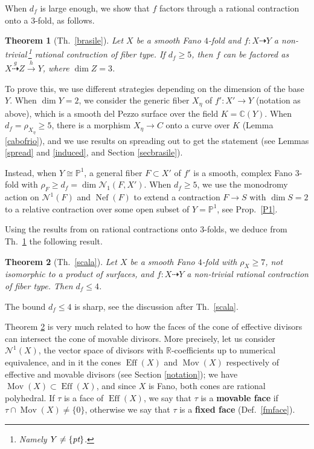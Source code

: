 \documentclass[a4paper,12pt]{amsart}
\newtheorem{thm}{Theorem}[section]
\theoremstyle{definition}
\numberwithin{figure}{section}
\numberwithin{table}{section}
\newcommand{\pr}{\mathbb{P}}
\newcommand{\C}{\mathbb{C}}
\newcommand{\R}{\mathbb{R}}
\newcommand{\N}{\mathcal{N}_1}
\newcommand{\Nu}{\mathcal{N}^1}
\newcommand{\Eff}{\operatorname{Eff}}
\newcommand{\Nef}{\operatorname{Nef}}
\newcommand{\Mov}{\operatorname{Mov}}
\newcommand{\pt}{\text{\it pt}}
\begin{document}
 When $d_f$ is large enough, we show that $f$ factors through a rational contraction onto a $3$-fold, as follows.
  \begin{thm}[Th.~\ref{brasile}]\label{brasileintro}
    Let $X$ be a smooth Fano $4$-fold and $f\colon X\dasharrow Y$ a
    non-trivial$\,$\footnote{Namely  $Y\neq\{\pt\}$.} rational contraction  of fiber type.
  If $d_f\geq 5$, then
 $f$ can be factored as $X\stackrel{g}{\dasharrow} Z\stackrel{h}{\to} Y$, where $\dim Z=3$.
\end{thm}
To prove this, we use different strategies depending on the dimension of the base $Y$. When $\dim Y=2$, we consider the generic fiber $X_{\eta}$ of $f'\colon X'\to Y$ (notation as above),
which is a smooth del Pezzo surface  over the field $K=\C(Y)$.
When $d_f=\rho_{X_{\eta}}\geq 5$, there is a morphism $X_{\eta}\to C$ onto a curve over $K$ (Lemma \ref{cabofrio}), and we use results on spreading out to get the statement (see Lemmas \ref{spread} and \ref{induced}, and Section \ref{secbrasile}).

Instead, when $Y\cong\pr^1$, a general fiber $F\subset X'$ of $f'$ is a smooth, complex Fano $3$-fold with $\rho_F\geq d_f=\dim\N(F,X')$. When $d_f\geq 5$, we  use the monodromy action on $\Nu(F)$ and $\Nef(F)$ to extend a contraction  $F\to S$ with $\dim S=2$ to a relative contraction over some open subset of $Y=\pr^1$, see Prop.~\ref{P1}. 

\medskip

Using the results from \cite{3folds} on rational contractions onto $3$-folds, we deduce from Th.~\ref{brasileintro} the following result.
\begin{thm}[Th.~\ref{scala}]\label{scalaintro}
  Let $X$ be a smooth Fano $4$-fold with $\rho_X\geq 7$, not isomorphic to a product of surfaces, and $f\colon X\dasharrow Y$ a non-trivial rational contraction of fiber type.
 Then $d_f\leq 4$.
\end{thm}
\noindent The bound  $d_f\leq 4$ is sharp, see the discussion after Th.~\ref{scala}.

Theorem \ref{scalaintro} is very much related to how 
the faces of the cone of effective divisors can intersect the cone of movable divisors.
More precisely, let us consider $\Nu(X)$, the vector space of divisors with $\R$-coefficients up to  numerical equivalence, and in it the cones $\Eff(X)$ and $\Mov(X)$ respectively of effective and movable divisors (see Section \ref{notation}); we have $\Mov(X)\subset\Eff(X)$, and since $X$ is Fano, both cones are rational polyhedral.
If $\tau$ is a face of $\Eff(X)$, we say that $\tau$ is a {\bf movable face} if $\tau\cap\Mov(X)\neq\{0\}$, otherwise we say that $\tau$ is a {\bf fixed face} (Def.~\ref{fmface}).
\end{document}
